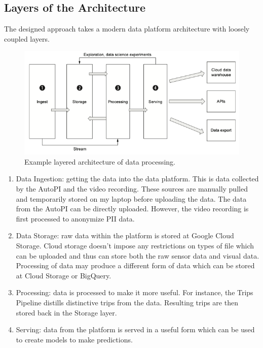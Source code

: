 \subsection{Layers of the Architecture}

The designed approach takes a modern data platform architecture with loosely coupled layers. 

\begin{figure}[H]
\begin{center}
\includegraphics[width=\textwidth,keepaspectratio]{images/4_data/architecture-example.png}
\end{center}
\caption{Example layered architecture of data processing.}
\end{figure}

\begin{enumerate}
\item Data Ingestion: getting the data into the data platform. This is data collected by the AutoPI and the video recording. These sources are manually pulled and temporarily stored on my laptop before uploading the data. The data from the AutoPI can be directly uploaded. However, the video recording is first processed to anonymize PII data.
\item Data Storage: raw data within the platform is stored at Google Cloud Storage. Cloud storage doesn't impose any restrictions on types of file which can be uploaded and thus can store both the raw sensor data and visual data. Processing of data may produce a different form of data which can be stored at Cloud Storage or BigQuery.
\item Processing: data is processed to make it more useful. For instance, the Trips Pipeline distills distinctive trips from the data. Resulting trips are then stored back in the Storage layer.
\item Serving: data from the platform is served in a useful form which can be used to create models to make predictions. 
\end{enumerate}



